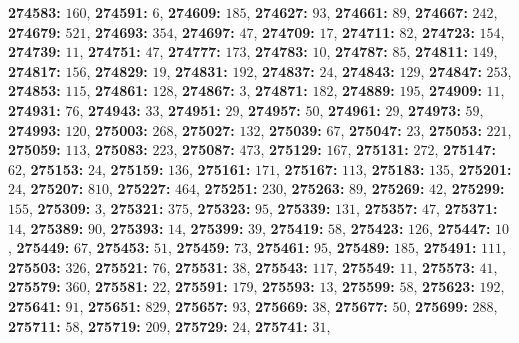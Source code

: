 \textsf{\bfseries 274583:} $160$, \textsf{\bfseries 274591:} $6$, \textsf{\bfseries 274609:} $185$, \textsf{\bfseries 274627:} $93$, \textsf{\bfseries 274661:} $89$, \textsf{\bfseries 274667:} $242$, \textsf{\bfseries 274679:} $521$, \textsf{\bfseries 274693:} $354$, \textsf{\bfseries 274697:} $47$, \textsf{\bfseries 274709:} $17$, \textsf{\bfseries 274711:} $82$, \textsf{\bfseries 274723:} $154$, \textsf{\bfseries 274739:} $11$, \textsf{\bfseries 274751:} $47$, \textsf{\bfseries 274777:} $173$, \textsf{\bfseries 274783:} $10$, \textsf{\bfseries 274787:} $85$, \textsf{\bfseries 274811:} $149$, \textsf{\bfseries 274817:} $156$, \textsf{\bfseries 274829:} $19$, \textsf{\bfseries 274831:} $192$, \textsf{\bfseries 274837:} $24$, \textsf{\bfseries 274843:} $129$, \textsf{\bfseries 274847:} $253$, \textsf{\bfseries 274853:} $115$, \textsf{\bfseries 274861:} $128$, \textsf{\bfseries 274867:} $3$, \textsf{\bfseries 274871:} $182$, \textsf{\bfseries 274889:} $195$, \textsf{\bfseries 274909:} $11$, \textsf{\bfseries 274931:} $76$, \textsf{\bfseries 274943:} $33$, \textsf{\bfseries 274951:} $29$, \textsf{\bfseries 274957:} $50$, \textsf{\bfseries 274961:} $29$, \textsf{\bfseries 274973:} $59$, \textsf{\bfseries 274993:} $120$, \textsf{\bfseries 275003:} $268$, \textsf{\bfseries 275027:} $132$, \textsf{\bfseries 275039:} $67$, \textsf{\bfseries 275047:} $23$, \textsf{\bfseries 275053:} $221$, \textsf{\bfseries 275059:} $113$, \textsf{\bfseries 275083:} $223$, \textsf{\bfseries 275087:} $473$, \textsf{\bfseries 275129:} $167$, \textsf{\bfseries 275131:} $272$, \textsf{\bfseries 275147:} $62$, \textsf{\bfseries 275153:} $24$, \textsf{\bfseries 275159:} $136$, \textsf{\bfseries 275161:} $171$, \textsf{\bfseries 275167:} $113$, \textsf{\bfseries 275183:} $135$, \textsf{\bfseries 275201:} $24$, \textsf{\bfseries 275207:} $810$, \textsf{\bfseries 275227:} $464$, \textsf{\bfseries 275251:} $230$, \textsf{\bfseries 275263:} $89$, \textsf{\bfseries 275269:} $42$, \textsf{\bfseries 275299:} $155$, \textsf{\bfseries 275309:} $3$, \textsf{\bfseries 275321:} $375$, \textsf{\bfseries 275323:} $95$, \textsf{\bfseries 275339:} $131$, \textsf{\bfseries 275357:} $47$, \textsf{\bfseries 275371:} $14$, \textsf{\bfseries 275389:} $90$, \textsf{\bfseries 275393:} $14$, \textsf{\bfseries 275399:} $39$, \textsf{\bfseries 275419:} $58$, \textsf{\bfseries 275423:} $126$, \textsf{\bfseries 275447:} $10$, \textsf{\bfseries 275449:} $67$, \textsf{\bfseries 275453:} $51$, \textsf{\bfseries 275459:} $73$, \textsf{\bfseries 275461:} $95$, \textsf{\bfseries 275489:} $185$, \textsf{\bfseries 275491:} $111$, \textsf{\bfseries 275503:} $326$, \textsf{\bfseries 275521:} $76$, \textsf{\bfseries 275531:} $38$, \textsf{\bfseries 275543:} $117$, \textsf{\bfseries 275549:} $11$, \textsf{\bfseries 275573:} $41$, \textsf{\bfseries 275579:} $360$, \textsf{\bfseries 275581:} $22$, \textsf{\bfseries 275591:} $179$, \textsf{\bfseries 275593:} $13$, \textsf{\bfseries 275599:} $58$, \textsf{\bfseries 275623:} $192$, \textsf{\bfseries 275641:} $91$, \textsf{\bfseries 275651:} $829$, \textsf{\bfseries 275657:} $93$, \textsf{\bfseries 275669:} $38$, \textsf{\bfseries 275677:} $50$, \textsf{\bfseries 275699:} $288$, \textsf{\bfseries 275711:} $58$, \textsf{\bfseries 275719:} $209$, \textsf{\bfseries 275729:} $24$, \textsf{\bfseries 275741:} $31$, 
